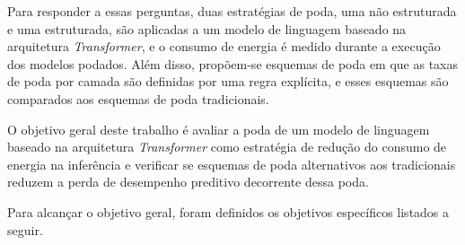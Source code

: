 Para responder a essas perguntas, duas estratégias de poda, uma não estruturada e uma
estruturada, são aplicadas a um modelo de linguagem baseado na arquitetura
\textit{Transformer}, e o consumo de energia é medido durante a execução dos modelos podados.
Além disso, propõem-se esquemas de poda em que as taxas de poda por camada são definidas por
uma regra explícita, e esses esquemas são comparados aos esquemas de poda tradicionais.

O objetivo geral deste trabalho é avaliar a poda de um modelo de linguagem baseado na
arquitetura \textit{Transformer} como estratégia de redução do consumo de energia na inferência
e verificar se esquemas de poda alternativos aos tradicionais reduzem a perda de desempenho
preditivo decorrente dessa poda.

Para alcançar o objetivo geral, foram definidos os objetivos específicos listados a seguir.

